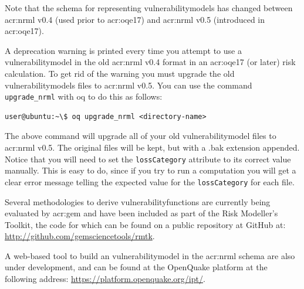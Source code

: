 Note that the schema for representing \glspl{vulnerabilitymodel} has changed
between \gls{acr:nrml} v0.4 (used prior to \gls{acr:oqe17}) and \gls{acr:nrml}
v0.5 (introduced in \gls{acr:oqe17}).

A deprecation warning is printed every time you attempt to use a
\gls{vulnerabilitymodel} in the old \gls{acr:nrml} v0.4 format in an
\gls{acr:oqe17} (or later) risk calculation. To get rid of the warning you
must upgrade the old \glspl{vulnerabilitymodel} files to \gls{acr:nrml} v0.5.
You can use the command \Verb+upgrade_nrml+ with oq to do this as
follows:

\begin{verbatim}
user@ubuntu:~\$ oq upgrade_nrml <directory-name>
\end{verbatim}

The above command will upgrade all of your old \gls{vulnerabilitymodel} files to
\gls{acr:nrml} v0.5. The original files will be kept, but with a .bak extension
appended. Notice that you will need to set the \Verb+lossCategory+ attribute
to its correct value manually. This is easy to do, since if you try to run a
computation you will get a clear error message telling the expected value for
the \Verb+lossCategory+ for each file.


Several methodologies to derive \glspl{vulnerabilityfunction} are currently being
evaluated by \gls{acr:gem} and have been included as part of the Risk
Modeller's Toolkit, the code for which can be found on a public repository at
GitHub at: 
\href{http://github.com/gemsciencetools/rmtk}{http://github.com/gemsciencetools/rmtk}.

A web-based tool to build an \gls{vulnerabilitymodel} in the \gls{acr:nrml} schema
are also under development, and can be found at the OpenQuake platform at the
following address: \href{https://platform.openquake.org/ipt/}{https://platform.openquake.org/ipt/}.
